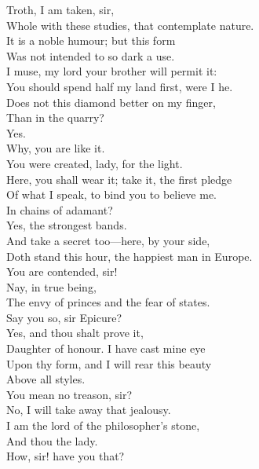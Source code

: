 \documentclass[a4paper,oneside,12pt]{memoir}
\begin{document}
\begin{drama*}
\dolspeaks {} Troth, I am taken, sir,\\
Whole with these studies, that contemplate nature.\\
\mammonspeaks It is a noble humour; but this form\\
Was not intended to so dark a use.\\
I muse, my lord your brother will permit it:\\
You should spend half my land first, were I he.\\
Does not this diamond better on my finger,\\
Than in the quarry?\\
\dolspeaks {} Yes.\\
\mammonspeaks {} Why, you are like it.\\
You were created, lady, for the light.\\
Here, you shall wear it; take it, the first pledge\\
Of what I speak, to bind you to believe me.\\
\dolspeaks In chains of adamant?\\
\mammonspeaks {} Yes, the strongest bands.\\
And take a secret too---here, by your side,\\
Doth stand this hour, the happiest man in Europe.\\
\dolspeaks You are contended, sir!\\
\mammonspeaks {} Nay, in true being,\\
The envy of princes and the fear of states.\\
\dolspeaks Say you so, sir Epicure?\\
\mammonspeaks {} Yes, and thou shalt prove it,\\
Daughter of honour. I have cast mine eye\\
Upon thy form, and I will rear this beauty\\
Above all styles.\\
\dolspeaks {} You mean no treason, sir?\\
\mammonspeaks No, I will take away that jealousy.\\
I am the lord of the philosopher's stone,\\
And thou the lady.\\
\dolspeaks {} How, sir! have you that?\\

\end{drama*}
\end{document}
